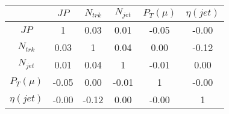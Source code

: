 \begin{tabular}{|c|c|c|c|c|c|} 
\hline
 & $JP$ & $N_{trk}$ & $N_{jet}$ & $P_{T} (\mu)$ & $\eta (jet)$ \\ \hline
$JP$ & 1 & 0.03 & 0.01 & -0.05 & -0.00 \\
$N_{trk}$ & 0.03 & 1 & 0.04 & 0.00 & -0.12 \\
$N_{jet}$ & 0.01 & 0.04 & 1 & -0.01 & 0.00 \\
$P_{T} (\mu)$ & -0.05 & 0.00 & -0.01 & 1 & -0.00 \\
$\eta (jet)$ & -0.00 & -0.12 & 0.00 & -0.00 & 1 \\
\hline 
\end{tabular} 


